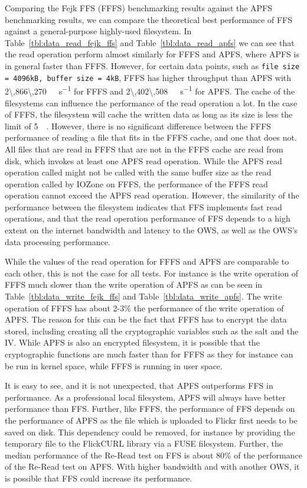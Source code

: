 Comparing the Fejk FFS (FFFS) benchmarking results against the APFS benchmarking results, we can compare the theoretical best performance of FFS against a general-purpose highly-used filesystem. In Table~\ref{tbl:data_read_fejk_ffs} and Table~\ref{tbl:data_read_apfs} we can see that the read operation perform almost similarly for FFFS and APFS, where APFS is in general faster than FFFS. However, for certain data points, such as \texttt{file size = 4096kB, buffer size = 4kB}, FFFS has higher throughput than APFS with \SI[per-mode = symbol]{2\,866\,270}{\kilo\byte\per\second} for FFFS and \SI[per-mode = symbol]{2\,402\,508}{\kilo\byte\per\second} for APFS. The cache of the filesystems can influence the performance of the read operation a lot. In the case of FFFS, the filesystem will cache the written data as long as its size is less the limit of \SI{5}{\mega\byte}. However, there is no significant difference between the FFFS performance of reading a file that fits in the FFFS cache, and one that does not. All files that are read in FFFS that are not in the FFFS cache are read from disk, which invokes at least one APFS read operation. While the APFS read operation called might not be called with the same buffer size as the read operation called by IOZone on FFFS, the performance of the FFFS read operation cannot exceed the APFS read operation. However, the similarity of the performance between the filesystem indicates that FFS implements fast read operations, and that the read operation performance of FFS depends to a high extent on the internet bandwidth and latency to the OWS, as well as the OWS's data processing performance.

While the values of the read operation for FFFS and APFS are comparable to each other, this is not the case for all tests. For instance is the write operation of FFFS much slower than the write operation of APFS as can be seen in Table~\ref{tbl:data_write_fejk_ffs} and Table~\ref{tbl:data_write_apfs}. The write operation of FFFS has about 2-3\% the performance of the write operation of APFS. The reason for this can be the fact that FFFS has to encrypt the data stored, including creating all the cryptographic variables such as the salt and the IV. While APFS is also an encrypted filesystem, it is possible that the cryptographic functions are much faster than for FFFS as they for instance can be run in kernel space, while FFFS is running in user space.

It is easy to see, and it is not unexpected, that APFS outperforms FFS in performance. As a professional local filesystem, APFS will always have better performance than FFS. Further, like FFFS, the performance of FFS depends on the performance of APFS as the file which is uploaded to Flickr first needs to be saved on disk. This dependency could be removed, for instance by providing the temporary file to the FlickCURL library via a FUSE filesystem. Further, the median performance of the Re-Read test on FFS is about 80\% of the performance of the Re-Read test on APFS. With higher bandwidth and with another OWS, it is possible that FFS could increase its performance. 